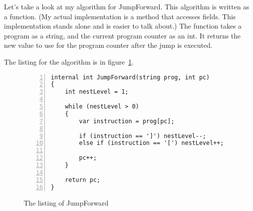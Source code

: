\documentclass[10pt]{amsart}
\begin{document}
Let's take a look at my algorithm for JumpForward. This algorithm
is written as a function. (My actual implementation is a method
that accesses fields. This implementation stands alone and is easier
to talk about.) The function takes a program as a string, and
the current program counter as an int. It returns the new value to use
for the program counter after the jump is executed.

The listing for the algorithm is in figure~\ref{fig:jumpforward}.

\begin{figure}
\caption{The listing of JumpForward}
\label{fig:jumpforward}
\begin{lstlisting}[numbers=left]
internal int JumpForward(string prog, int pc)
{
    int nestLevel = 1;

    while (nestLevel > 0)
    {
        var instruction = prog[pc];
        
        if (instruction == ']') nestLevel--;
        else if (instruction == '[') nestLevel++;
        
        pc++;
    }
	
    return pc;
}
\end{lstlisting}
\end{figure}
\end{document}
